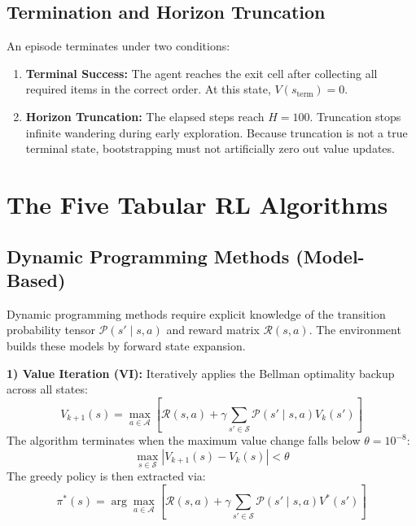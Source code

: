 \documentclass[10pt,conference]{IEEEtran}
\begin{document}
\subsection{Termination and Horizon Truncation}
An episode terminates under two conditions:
\begin{enumerate}
    \item \textbf{Terminal Success:} The agent reaches the exit cell after collecting all required items in the correct order. At this state, $V(s_{\text{term}}) = 0$.
    \item \textbf{Horizon Truncation:} The elapsed steps reach $H = 100$. Truncation stops infinite wandering during early exploration. Because truncation is not a true terminal state, bootstrapping must not artificially zero out value updates.
\end{enumerate}

\section{The Five Tabular RL Algorithms}

\subsection{Dynamic Programming Methods (Model-Based)}
Dynamic programming methods require explicit knowledge of the transition probability tensor $\mathcal{P}(s' \mid s, a)$ and reward matrix $\mathcal{R}(s, a)$. The environment builds these models by forward state expansion.

\textbf{1) Value Iteration (VI):} Iteratively applies the Bellman optimality backup across all states:
\begin{equation}
    V_{k+1}(s) = \max_{a \in \mathcal{A}} \left[ \mathcal{R}(s, a) + \gamma \sum_{s' \in \mathcal{S}} \mathcal{P}(s' \mid s, a) V_k(s') \right]
\end{equation}
The algorithm terminates when the maximum value change falls below $\theta = 10^{-8}$:
\begin{equation}
    \max_{s \in \mathcal{S}} |V_{k+1}(s) - V_k(s)| < \theta
\end{equation}
The greedy policy is then extracted via:
\begin{equation}
    \pi^*(s) = \arg\max_{a \in \mathcal{A}} \left[ \mathcal{R}(s, a) + \gamma \sum_{s' \in \mathcal{S}} \mathcal{P}(s' \mid s, a) V^*(s') \right]
\end{equation}
\end{document}

